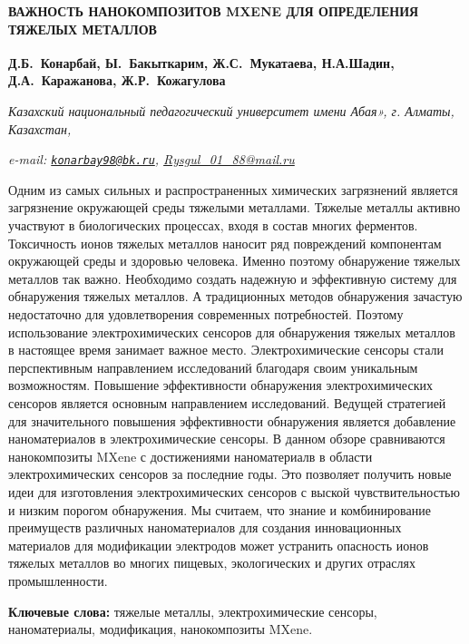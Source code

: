 \begin{articleheader}
{\bfseries ВАЖНОСТЬ НАНОКОМПОЗИТОВ MXENE ДЛЯ ОПРЕДЕЛЕНИЯ ТЯЖЕЛЫХ МЕТАЛЛОВ}

{\bfseries Д.Б.~Конарбай\textsuperscript{\envelope },
Ы.~Бакыткарим\textsuperscript{\envelope },
Ж.С.~Мукатаева,
Н.А.Шадин,
Д.А.~Каражанова,
Ж.Р.~Кожагулова}
\end{articleheader}

\begin{affiliation}
\emph{Казахский национальный педагогический университет имени Абая», г. Алматы, Казахстан,}

\emph{e-mail: \href{mailto:konarbay98@bk.ru}{\nolinkurl{konarbay98@bk.ru}}, \href{mailto:Rysgul_01_88@mail.ru}{Rysgul\_01\_88@mail.ru}}
\end{affiliation}

Одним из самых сильных и распространенных химических загрязнений
является загрязнение окружающей среды тяжелыми металлами. Тяжелые
металлы активно участвуют в биологических процессах, входя в
состав многих ферментов. Токсичность ионов тяжелых металлов
наносит ряд повреждений компонентам окружающей среды и здоровью
человека. Именно поэтому обнаружение тяжелых металлов так важно.
Необходимо создать надежную и эффективную систему для обнаружения
тяжелых металлов. А традиционных методов обнаружения зачастую
недостаточно для удовлетворения современных потребностей. Поэтому
использование электрохимических сенсоров для обнаружения тяжелых
металлов в настоящее время занимает важное место.
Электрохимические сенсоры стали перспективным направлением
исследований благодаря своим уникальным возможностям. Повышение
эффективности обнаружения электрохимических сенсоров является
основным направлением исследований. Ведущей стратегией для
значительного повышения эффективности обнаружения является
добавление наноматериалов в электрохимические сенсоры. В данном
обзоре сравниваются нанокомпозиты MXene с достижениями
наноматериалв в области электрохимических сенсоров за последние
годы. Это позволяет получить новые идеи для изготовления
электрохимических сенсоров с выской чувствительностью и низким
порогом обнаружения. Мы считаем, что знание и комбинирование
преимуществ различных наноматериалов для создания инновационных
материалов для модификации электродов может устранить опасность
ионов тяжелых металлов во многих пищевых, экологических и других
отраслях промышленности.

{\bfseries Ключевые слова:} тяжелые металлы, электрохимические
сенсоры, наноматериалы, модификация, нанокомпозиты MXene.

